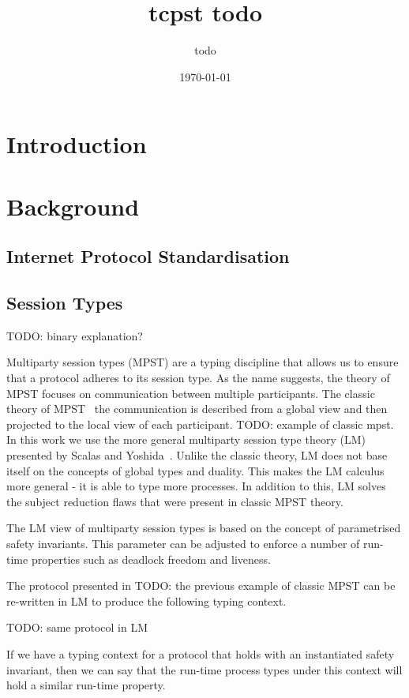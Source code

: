 \documentclass{article}
\title{tcpst todo}
\author{todo}
\date{\today}
\newcommand{\todo}[1]{}
\renewcommand{\todo}[1]{{\color{red} TODO: {#1}}}
\begin{document}
\maketitle

\section{Introduction}

\section{Background}

\subsection{Internet Protocol Standardisation}

\subsection{Session Types}

\todo{binary explanation?}

Multiparty session types (MPST) are a typing discipline that allows us to ensure that a protocol adheres to its session type.
As the name suggests, the theory of MPST focuses on communication between multiple participants.
The classic theory of MPST~\cite{todo} the communication is described from a global view and then projected to the local view of each participant.
\todo{example of classic mpst}.
In this work we use the more general multiparty session type theory (LM) presented by Scalas and Yoshida~\cite{SY19}.
Unlike the classic theory, LM does not base itself on the concepts of global types and duality.
This makes the LM calculus more general - it is able to type more processes.
In addition to this, LM solves the subject reduction flaws that were present in classic MPST theory.

The LM view of multiparty session types is based on the concept of parametrised safety invariants.
This parameter can be adjusted to enforce a number of run-time properties such as deadlock freedom and liveness.

The protocol presented in \todo{the previous example of classic MPST} can be re-written in LM to produce the following typing context.

\todo{same protocol in LM}

If we have a typing context for a protocol that holds with an instantiated safety invariant, then we can say that the run-time process types under this context will hold a similar run-time property.
\end{document}
